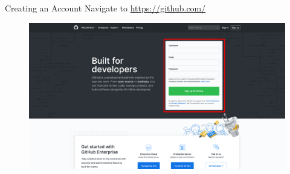 \documentclass{beamer}
\begin{document}
    \begin{frame}{Creating an Account}
        Navigate to \url{https://github.com/}

        \begin{figure}
            \centering
            \includegraphics[width=\textwidth]{figures/github.png}
        \end{figure}
    \end{frame}
\end{document}
